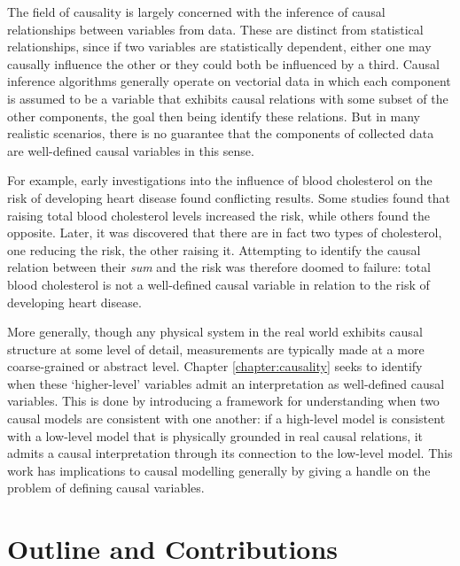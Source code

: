The field of causality is largely concerned with the inference of causal relationships between variables from data. 
These are distinct from statistical relationships, since if two variables are statistically dependent, either one may causally influence the other or they could both be influenced by a third.
Causal inference algorithms generally operate on vectorial data in which each component is assumed to be a variable that exhibits causal relations with some subset of the other components, the goal then being identify these relations.
But in many realistic scenarios, there is no guarantee that the components of collected data are well-defined causal variables in this sense.

For example, early investigations into the influence of blood cholesterol on the risk of developing heart disease found conflicting results.
Some studies found that raising total blood cholesterol levels increased the risk, while others found the opposite. 
Later, it was discovered that there are in fact two types of cholesterol, one reducing the risk, the other raising it. 
Attempting to identify the causal relation between their \emph{sum} and the risk was therefore doomed to failure: total blood cholesterol is not a well-defined causal variable in relation to the risk of developing heart disease.

More generally, though any physical system in the real world exhibits causal structure at some level of detail, measurements are typically made at a more coarse-grained or abstract level. 
Chapter \ref{chapter:causality} seeks to identify when these `higher-level' variables admit an interpretation as well-defined causal variables.
This is done by introducing a framework for understanding when two causal models are consistent with one another: if a high-level model is consistent with a low-level model that is physically grounded in real causal relations, it admits a causal interpretation through its connection to the low-level model.
This work has implications to causal modelling generally by giving a handle on the problem of defining causal variables. 




\section{Outline and Contributions}


